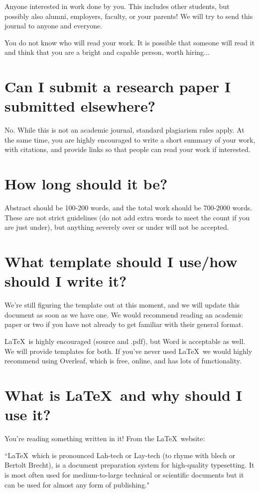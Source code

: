 \documentclass[12pt]{article}
\begin{document}
Anyone interested in work done by you. This includes other students, but possibly also alumni, employers, faculty, or your parents! We will try to send this journal to anyone and everyone.

You do not know who will read your work. It is possible that someone will read it and think that you are a bright and capable person, worth hiring...

\section{Can I submit a research paper I submitted elsewhere?}
No. While this is not an academic journal, standard plagiarism rules apply. At the same time, you are highly encouraged to write a short summary of your work, with citations, and provide links so that people can read your work if interested.

\section{How long should it be?}
Abstract should be 100-200 words, and the total work should be 700-2000 words. These are not strict guidelines (do not add extra words to meet the count if you are just under), but anything severely over or under will not be accepted.

\section{What template should I use/how should I write it?}
We're still figuring the template out at this moment, and we will update this document as soon as we have one. We would recommend reading an academic paper or two if you have not already to get familiar with their general format.

\LaTeX\ is highly encouraged (source and .pdf), but Word is acceptable as well. We will provide templates for both. If you've never used \LaTeX\, we would highly recommend using Overleaf, which is free, online, and has lots of functionality.

\section{What is \LaTeX\ and why should I use it?}

You're reading something written in it! From the \LaTeX\ website:

``\LaTeX\, which is pronounced Lah-tech or Lay-tech (to rhyme with blech or Bertolt Brecht), is a document preparation system for high-quality typesetting. It is most often used for medium-to-large technical or scientific documents but it can be used for almost any form of publishing."
\end{document}
